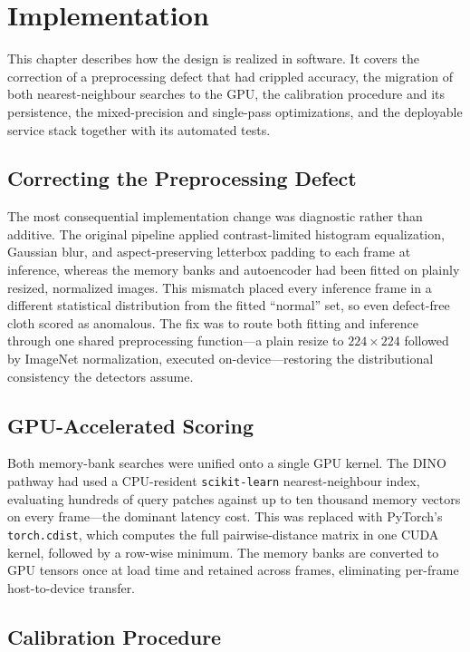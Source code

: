 \chapter{Implementation}

This chapter describes how the design is realized in software. It covers the correction of a preprocessing defect that had crippled accuracy, the migration of both nearest-neighbour searches to the GPU, the calibration procedure and its persistence, the mixed-precision and single-pass optimizations, and the deployable service stack together with its automated tests.

\section{Correcting the Preprocessing Defect}

The most consequential implementation change was diagnostic rather than additive. The original pipeline applied contrast-limited histogram equalization, Gaussian blur, and aspect-preserving letterbox padding to each frame at inference, whereas the memory banks and autoencoder had been fitted on plainly resized, normalized images. This mismatch placed every inference frame in a different statistical distribution from the fitted ``normal'' set, so even defect-free cloth scored as anomalous. The fix was to route both fitting and inference through one shared preprocessing function---a plain resize to $224\times224$ followed by ImageNet normalization, executed on-device---restoring the distributional consistency the detectors assume.

\section{GPU-Accelerated Scoring}

Both memory-bank searches were unified onto a single GPU kernel. The DINO pathway had used a CPU-resident \texttt{scikit-learn} nearest-neighbour index, evaluating hundreds of query patches against up to ten thousand memory vectors on every frame---the dominant latency cost. This was replaced with PyTorch's \texttt{torch.cdist}, which computes the full pairwise-distance matrix in one CUDA kernel, followed by a row-wise minimum. The memory banks are converted to GPU tensors once at load time and retained across frames, eliminating per-frame host-to-device transfer.

\section{Calibration Procedure}

